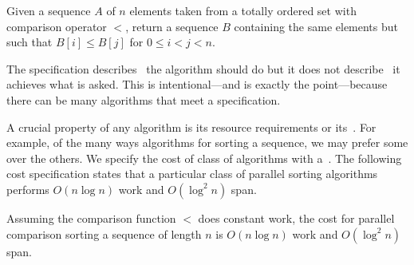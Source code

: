 \begin{cluster}
\label{grp:def:introduction::spec::comparison-sort}

\begin{definition}
\label{def:introduction::spec::comparison-sort}
Given a sequence $A$ of $n$ elements taken from a totally ordered set
with comparison operator $<$, return a
sequence $B$ containing the same elements but such that $B[i] \leq
B[j]$ for $0 \leq i < j < n$.

\end{definition}
\end{cluster}

\begin{cluster}
\label{grp:nt:introduction::spec::specification}

\begin{note}
\label{nt:introduction::spec::specification}
The specification describes~ the algorithm should do but it
does not describe~ it achieves what is asked.
This is intentional---and is exactly the point---because there can be
many algorithms that meet a specification.

\end{note}
\end{cluster}

\begin{cluster}
\label{grp:grm:introduction::spec::crucial}

\begin{gram}
\label{grm:introduction::spec::crucial}
A crucial property of any algorithm is its resource requirements or
its~.
For example, of the many ways algorithms for sorting a sequence, we
may prefer some over the others.  
We specify the cost of class of algorithms with a~.  The following cost specification states that a
particular class of parallel sorting algorithms performs $O(n
\log{n})$ work and $O(\log^2{n})$ span.

\end{gram}
\end{cluster}

\begin{cluster}
\label{grp:cost:intro::spec::sorting-efficient}

\begin{costspec}
\label{cost:intro::spec::sorting-efficient}
Assuming the comparison function $<$ does constant work, the cost for
parallel comparison sorting a sequence of length $n$ is $O(n \log n)$
work and $O(\log^2 n)$ span.

\end{costspec}
\end{cluster}

